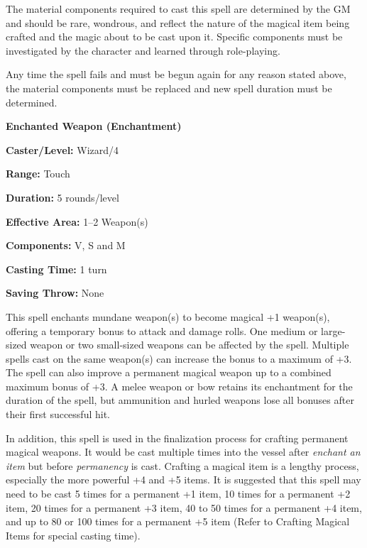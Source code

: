 \begin{multicols}{2}
The material components required to cast this spell are determined by the GM and should be rare, wondrous, and reflect the nature of the magical item being crafted and the magic about to be cast upon it.  Specific components must be investigated by the character and learned through role-playing.

Any time the spell fails and must be begun again for any reason stated above, the material components must be replaced and new spell duration must be determined.

\vspace{1em}

\noindent
\begin{minipage}{\columnwidth}

\noindent \textbf{Enchanted Weapon (Enchantment)}

\noindent \textbf{Caster/Level:} Wizard/4

\noindent \textbf{Range:} Touch

\noindent \textbf{Duration:} 5 rounds/level

\noindent \textbf{Effective Area:} 1--2 Weapon(s)

\noindent \textbf{Components:} V, S and M

\noindent \textbf{Casting Time:} 1 turn

\noindent \textbf{Saving Throw:} None

\end{minipage}

This spell enchants mundane weapon(s) to become magical +1 weapon(s), offering a temporary bonus to attack and damage rolls.  One medium or large-sized weapon or two small-sized weapons can be affected by the spell.  Multiple spells cast on the same weapon(s) can increase the bonus to a maximum of +3.  The spell can also improve a permanent magical weapon up to a combined maximum bonus of +3.  A melee weapon or bow retains its enchantment for the duration of the spell, but ammunition and hurled weapons lose all bonuses after their first successful hit.

In addition, this spell is used in the finalization process for crafting permanent magical weapons.  It would be cast multiple times into the vessel after \textit{enchant an item} but before \textit{permanency} is cast.  Crafting a magical item is a lengthy process, especially the more powerful +4 and +5 items.  It is suggested that this spell may need to be cast 5 times for a permanent +1 item, 10 times for a permanent +2 item, 20 times for a permanent +3 item, 40 to 50 times for a permanent +4 item, and up to 80 or 100 times for a permanent +5 item (Refer to Crafting Magical Items for special casting time).


\end{multicols}

